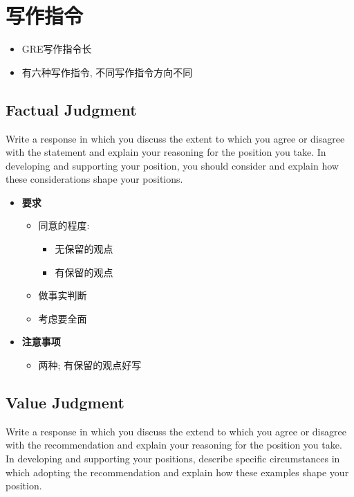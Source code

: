 \section{写作指令}

  \begin{itemize}
    \item GRE写作指令长
    \item 有六种写作指令, 不同写作指令方向不同
  \end{itemize}

  \subsection{Factual Judgment}

    Write a response in which you discuss the extent to which you agree or
    disagree with the statement and explain your reasoning for the position you
    take. In developing and supporting your position, you should consider
     and
    explain how these considerations shape your positions.

    \begin{itemize}
      \item \textbf{要求}
      \begin{itemize}
        \item 同意的程度:
        \begin{itemize}
          \item 无保留的观点
          \item 有保留的观点
        \end{itemize}

        \item 做事实判断
        \item 考虑要全面
      \end{itemize}

      \item \textbf{注意事项}
      \begin{itemize}
        \item 两种; 有保留的观点好写
      \end{itemize}
    \end{itemize}

  \subsection{Value Judgment}

    Write a response in which you discuss the extend to which you agree
    or disagree with the recommendation and explain your reasoning for the
    position you take. In developing and supporting your positions,
    describe specific circumstances in which adopting the recommendation
     and explain how these
    examples shape your position.

